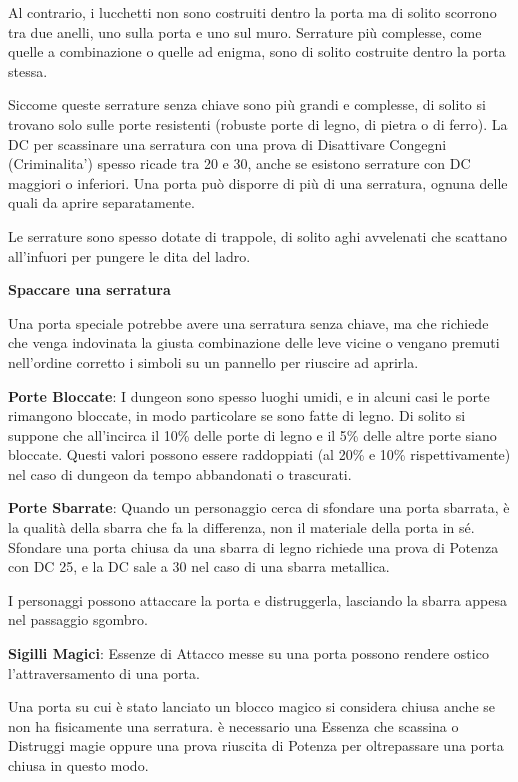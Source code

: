 \documentclass[a4paper,11pt,twoside,openany]{book}
\begin{document}
{Al contrario, i lucchetti non sono costruiti dentro la porta ma di solito scorrono tra due anelli, uno sulla porta e uno sul muro. Serrature più complesse, come quelle a combinazione o quelle ad enigma, sono di solito costruite dentro la porta stessa. 

Siccome queste serrature senza chiave sono più grandi e complesse, di solito si trovano solo sulle porte resistenti (robuste porte di legno, di pietra o di ferro). 
La DC per scassinare una serratura con una prova di Disattivare Congegni (Criminalita') spesso ricade tra 20 e 30, anche se esistono serrature con DC maggiori o inferiori. Una porta può disporre di più di una serratura, ognuna delle quali da aprire separatamente.

Le serrature sono spesso dotate di trappole, di solito aghi avvelenati che scattano all'infuori per pungere le dita del ladro.

\textbf{Spaccare una serratura}

Una porta speciale potrebbe avere una serratura senza chiave, ma che richiede che venga indovinata la giusta combinazione delle leve vicine o vengano premuti nell'ordine corretto i simboli su un pannello per riuscire ad aprirla.

\textbf{Porte Bloccate}: I dungeon sono spesso luoghi umidi, e in alcuni casi le porte rimangono bloccate, in modo particolare se sono fatte di legno. Di solito si suppone che all'incirca il 10\% delle porte di legno e il 5\% delle altre porte siano bloccate. Questi valori possono essere raddoppiati (al 20\% e 10\% rispettivamente) nel caso di dungeon da tempo abbandonati o trascurati.

\textbf{Porte Sbarrate}: Quando un personaggio cerca di sfondare una porta sbarrata, è la qualità della sbarra che fa la differenza, non il materiale della porta in sé. Sfondare una porta chiusa da una sbarra di legno richiede una prova di Potenza con DC 25, e la DC sale a 30 nel caso di una sbarra metallica.

I personaggi possono attaccare la porta e distruggerla, lasciando la sbarra appesa nel passaggio sgombro.

\textbf{Sigilli Magici}: Essenze di Attacco messe su una porta possono rendere ostico l'attraversamento di una porta.

Una porta su cui è stato lanciato un blocco magico si considera chiusa anche se non ha fisicamente una serratura. è necessario una Essenza che scassina o Distruggi magie oppure una prova riuscita di Potenza per oltrepassare una porta chiusa in questo modo.

}
\end{document}
